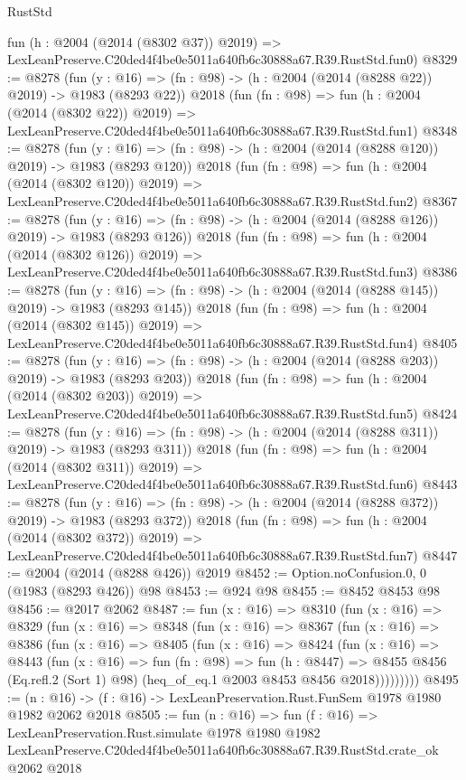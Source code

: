 \begin{lexlean}{RustStd}
\begin{coremodule}
    fun (h : @2004 (@2014 (@8302 @37)) @2019) =>
    LexLeanPreserve.C20ded4f4be0e5011a640fb6c30888a67.R39.RustStd.fun0)
@8329 := @8278
    (fun (y : @16) => (fn : @98) -> (h : @2004 (@2014 (@8288 @22)) @2019) -> @1983 (@8293 @22))
    @2018
    (fun (fn : @98) =>
    fun (h : @2004 (@2014 (@8302 @22)) @2019) =>
    LexLeanPreserve.C20ded4f4be0e5011a640fb6c30888a67.R39.RustStd.fun1)
@8348 := @8278
    (fun (y : @16) => (fn : @98) -> (h : @2004 (@2014 (@8288 @120)) @2019) -> @1983 (@8293 @120))
    @2018
    (fun (fn : @98) =>
    fun (h : @2004 (@2014 (@8302 @120)) @2019) =>
    LexLeanPreserve.C20ded4f4be0e5011a640fb6c30888a67.R39.RustStd.fun2)
@8367 := @8278
    (fun (y : @16) => (fn : @98) -> (h : @2004 (@2014 (@8288 @126)) @2019) -> @1983 (@8293 @126))
    @2018
    (fun (fn : @98) =>
    fun (h : @2004 (@2014 (@8302 @126)) @2019) =>
    LexLeanPreserve.C20ded4f4be0e5011a640fb6c30888a67.R39.RustStd.fun3)
@8386 := @8278
    (fun (y : @16) => (fn : @98) -> (h : @2004 (@2014 (@8288 @145)) @2019) -> @1983 (@8293 @145))
    @2018
    (fun (fn : @98) =>
    fun (h : @2004 (@2014 (@8302 @145)) @2019) =>
    LexLeanPreserve.C20ded4f4be0e5011a640fb6c30888a67.R39.RustStd.fun4)
@8405 := @8278
    (fun (y : @16) => (fn : @98) -> (h : @2004 (@2014 (@8288 @203)) @2019) -> @1983 (@8293 @203))
    @2018
    (fun (fn : @98) =>
    fun (h : @2004 (@2014 (@8302 @203)) @2019) =>
    LexLeanPreserve.C20ded4f4be0e5011a640fb6c30888a67.R39.RustStd.fun5)
@8424 := @8278
    (fun (y : @16) => (fn : @98) -> (h : @2004 (@2014 (@8288 @311)) @2019) -> @1983 (@8293 @311))
    @2018
    (fun (fn : @98) =>
    fun (h : @2004 (@2014 (@8302 @311)) @2019) =>
    LexLeanPreserve.C20ded4f4be0e5011a640fb6c30888a67.R39.RustStd.fun6)
@8443 := @8278
    (fun (y : @16) => (fn : @98) -> (h : @2004 (@2014 (@8288 @372)) @2019) -> @1983 (@8293 @372))
    @2018
    (fun (fn : @98) =>
    fun (h : @2004 (@2014 (@8302 @372)) @2019) =>
    LexLeanPreserve.C20ded4f4be0e5011a640fb6c30888a67.R39.RustStd.fun7)
@8447 := @2004 (@2014 (@8288 @426)) @2019
@8452 := Option.noConfusion.{0, 0} (@1983 (@8293 @426)) @98
@8453 := @924 @98
@8455 := @8452 @8453 @98
@8456 := @2017 @2062
@8487 := fun (x : @16) =>
  @8310
    (fun (x : @16) =>
    @8329
      (fun (x : @16) =>
      @8348
        (fun (x : @16) =>
        @8367
          (fun (x : @16) =>
          @8386
            (fun (x : @16) =>
            @8405
              (fun (x : @16) =>
              @8424
                (fun (x : @16) =>
                @8443
                  (fun (x : @16) =>
                  fun (fn : @98) =>
                  fun (h : @8447) =>
                  @8455
                    @8456
                    (Eq.refl.{2} (Sort 1) @98)
                    (heq_of_eq.{1} @2003 @8453 @8456 @2018)))))))))
@8495 := (n : @16) -> (f : @16) -> LexLeanPreservation.Rust.FunSem @1978 @1980 @1982 @2062 @2018
@8505 := fun (n : @16) =>
  fun (f : @16) =>
  LexLeanPreservation.Rust.simulate
    @1978
    @1980
    @1982
    LexLeanPreserve.C20ded4f4be0e5011a640fb6c30888a67.R39.RustStd.crate_ok
    @2062
    @2018
\end{coremodule}
\end{lexlean}
